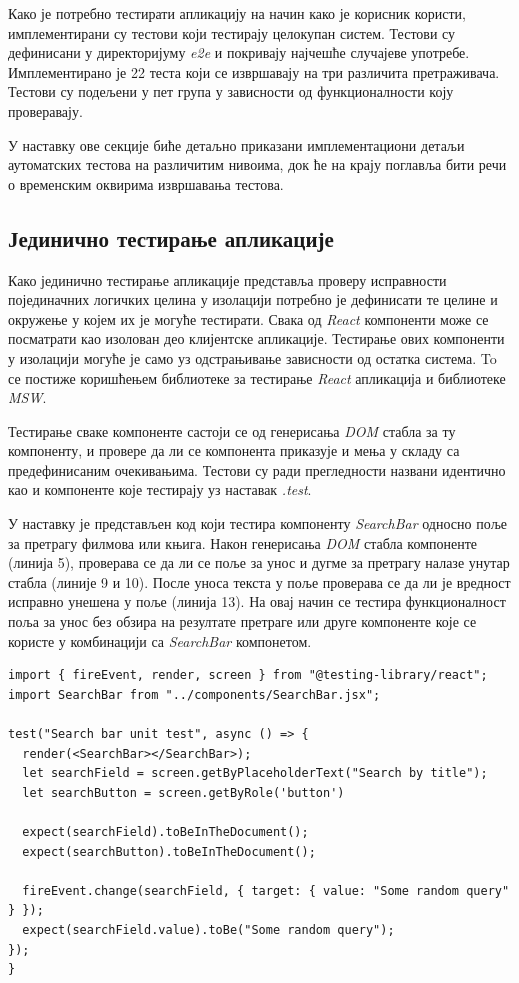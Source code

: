 \documentclass[12pt,oneside]{memoir}
\begin{document}
Како је потребно тестирати апликацију на начин како је корисник користи, имплементирани су тестови који тестирају целокупан систем. Тестови су дефинисани у директоријуму \textit{e2e} и покривају најчешће случајеве употребе. Имплементирано је 22 теста који се извршавају на три различита претраживача.  Тестови су подељени у пет група у зависности од функционалности коју проверавају.

У наставку ове секције биће детаљно приказани имплементациони детаљи аутоматских тестова на различитим нивоима, док ће на крају поглавља бити речи о временским оквирима извршавања тестова.

\subsection{Јединично тестирање апликације}

Како јединично тестирање апликације представља проверу исправности појединачних логичких целина у изолацији потребно је дефинисати те целине и окружење у којем их је могуће тестирати. Свака од \textit{React} компоненти може се посматрати као изолован део клијентске апликације. Тестирање ових компоненти у изолацији могуће је само уз одстрањивање зависности од остатка система. To се постиже коришћењем библиотеке за тестирање \textit{React} апликација и библиотеке \textit{MSW}.

Тестирање сваке компоненте састоји се од генерисања \textit{DOM} стабла за ту компоненту, и провере да ли се компонента приказује и мења у складу са предефинисаним очекивањима. Тестови су ради прегледности названи идентично као и компоненте које тестирају уз наставак \textit{.test}. 

У наставку је представљен код који тестира компоненту \textit{SearchBar} односно поље за претрагу филмова или књига. Након генерисања \textit{DOM} стабла компоненте (линија 5), проверава се да ли се поље за унос и дугме за претрагу налазе унутар стабла (линије 9 и 10). После уноса текста у поље проверава се да ли је вредност исправно унешена у поље (линија 13). На овај начин се тестира функционалност поља за унос без обзира на резултате претраге или друге компоненте које се користе у комбинацији са \textit{SearchBar} компонетом.

\begin{lstlisting}[caption=Јединично тестирање \textit{SearchBar} компоненте, 
basicstyle=\tiny,
label={lst:searchbarTest},
frame=single]
import { fireEvent, render, screen } from "@testing-library/react";
import SearchBar from "../components/SearchBar.jsx";

test("Search bar unit test", async () => {
  render(<SearchBar></SearchBar>);
  let searchField = screen.getByPlaceholderText("Search by title");
  let searchButton = screen.getByRole('button')
  
  expect(searchField).toBeInTheDocument();
  expect(searchButton).toBeInTheDocument();

  fireEvent.change(searchField, { target: { value: "Some random query" } });
  expect(searchField.value).toBe("Some random query");
});
}
\end{lstlisting}
\end{document}
